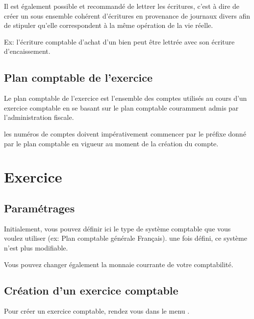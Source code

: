 \documentclass[a4paper,10pt,oneside,french]{sphinxmanual}
\begin{document}
Il est également possible et recommandé de lettrer les écritures, c’est à dire de créer un sous ensemble
cohérent d’écritures en provenance de journaux divers afin de stipuler qu’elle correspondent à la même opération de la vie réelle.

Ex: l’écriture comptable d’achat d’un bien peut être lettrée avec son écriture d’encaissement.


\subsection{Plan comptable de l’exercice}
\label{\detokenize{accounting/definition:plan-comptable-de-l-exercice}}
Le plan comptable de l’exercice est l’ensemble des comptes utilisés au
cours d’un exercice comptable en se basant sur le plan comptable
couramment admis par l’administration fiscale.

les numéros de comptes doivent impérativement commencer par le préfixe donné par le
plan comptable en vigueur au moment de la création du compte.


\section{Exercice}
\label{\detokenize{accounting/fiscalyear:exercice}}\label{\detokenize{accounting/fiscalyear::doc}}

\subsection{Paramétrages}
\label{\detokenize{accounting/fiscalyear:parametrages}}\begin{quote}

\noindent{}
\end{quote}

Initialement, vous pouvez définir ici le type de système comptable que
vous voulez utiliser (ex: Plan comptable générale Français).
 une fois défini, ce système n’est plus modifiable.

Vous pouvez changer également la monnaie courrante de votre comptabilité.


\subsection{Création d’un exercice comptable}
\label{\detokenize{accounting/fiscalyear:creation-d-un-exercice-comptable}}
Pour créer un exercice comptable, rendez vous dans le menu .
\begin{quote}

\noindent{}
\end{quote}
\end{document}
